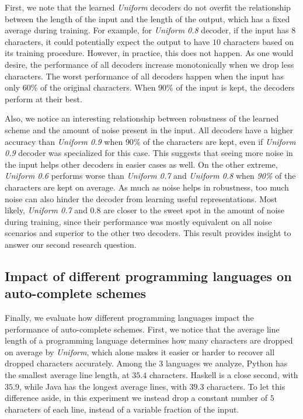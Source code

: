 \documentclass{article}
\begin{document}
First, we note that the learned \emph{Uniform} decoders
do not overfit the relationship between the length of the
input and the length of the output, which has a fixed
average during training. For example, for \emph{Uniform 0.8}
decoder, if the input has $8$ characters, it could
potentially expect the output to have $10$ characters
based on its training procedure. However, in practice,
this does not happen. As one would desire, the performance
of all decoders increase monotonically when we drop less
characters. The worst performance of all decoders happen
when the input has only $60\%$ of the original characters.
When $90\%$ of the input is kept, the decoders
perform at their best.

Also, we notice an interesting relationship between robustness
of the learned scheme and the amount of noise present in
the input. All decoders have a higher accuracy than
\emph{Uniform 0.9} when $90\%$ of the characters are kept,
even if \emph{Uniform 0.9} decoder was specialized for this
case. This suggests that seeing more noise in the input
helps other decoders in easier cases as well. On the
other extreme, \emph{Uniform 0.6} performs worse
than \emph{Uniform 0.7} and \emph{Uniform 0.8} when
\emph{90\%} of the characters are kept on average.
As much as noise helps in robustness, too much noise
can also hinder the decoder from learning useful representations. Most likely, \emph{Uniform 0.7} and $0.8$
are closer to the sweet spot in the amount of noise during
training, since their performance was mostly equivalent
on all noise scenarios and superior to the other two decoders.
This result provides insight to answer our second
research question.

\subsection{Impact of different programming languages on auto-complete schemes}

Finally, we evaluate how different programming
languages impact the performance of auto-complete
schemes. First, we notice that the average line length
of a programming language determines how many characters
are dropped on average by \emph{Uniform}, which alone
makes it easier or harder to recover all dropped
characters accurately.
Among the 3 languages we analyze, Python
has the smallest average line length, at $35.4$ characters.
Haskell is a close second, with $35.9$, while Java
has the longest average lines, with $39.3$ characters.
To let this difference aside, in this experiment we
instead drop a constant number of $5$ characters of each
line, instead of a variable fraction of the input.
\end{document}
